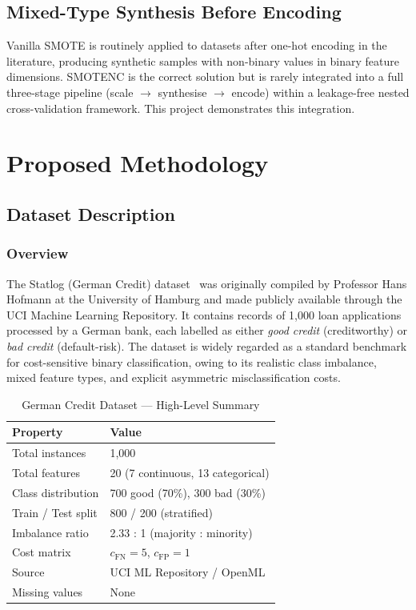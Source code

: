 \documentclass[12pt,a4paper]{article}
\begin{document}
\subsection{Mixed-Type Synthesis Before Encoding}

Vanilla SMOTE is routinely applied to datasets after one-hot encoding in the literature, producing synthetic samples with non-binary values in binary feature dimensions. SMOTENC is the correct solution but is rarely integrated into a full three-stage pipeline (scale $\rightarrow$ synthesise $\rightarrow$ encode) within a leakage-free nested cross-validation framework. This project demonstrates this integration.

\section{Proposed Methodology}

\subsection{Dataset Description}

\subsubsection{Overview}

The Statlog (German Credit) dataset~\citep{hofmann1994statlog} was originally compiled by Professor Hans Hofmann at the University of Hamburg and made publicly available through the UCI Machine Learning Repository. It contains records of 1,000 loan applications processed by a German bank, each labelled as either \textit{good credit} (creditworthy) or \textit{bad credit} (default-risk). The dataset is widely regarded as a standard benchmark for cost-sensitive binary classification, owing to its realistic class imbalance, mixed feature types, and explicit asymmetric misclassification costs.

\begin{table}[H]
\centering
\caption{German Credit Dataset --- High-Level Summary}
\label{tab:dataset}
\begin{tabular}{ll}
\toprule
\textbf{Property} & \textbf{Value} \\
\midrule
Total instances & 1,000 \\
Total features & 20 (7 continuous, 13 categorical) \\
Class distribution & 700 good (70\%), 300 bad (30\%) \\
Train / Test split & 800 / 200 (stratified) \\
Imbalance ratio & 2.33 : 1 (majority : minority) \\
Cost matrix & $c_\text{FN} = 5$, $c_\text{FP} = 1$ \\
Source & UCI ML Repository / OpenML \\
Missing values & None \\
\bottomrule
\end{tabular}
\end{table}
\end{document}
